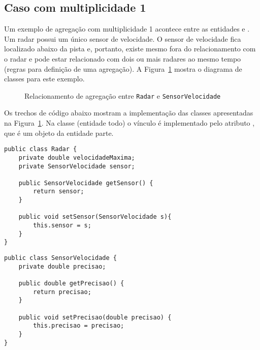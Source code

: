 \subsection{Caso com multiplicidade 1}

Um exemplo de agregação com multiplicidade 1 acontece entre as entidades  e . Um radar possui um único sensor de velocidade. O sensor de velocidade fica localizado abaixo da pista e, portanto, existe mesmo fora do relacionamento com o radar e pode estar relacionado com dois ou mais radares ao mesmo tempo (regras para definição de uma agregação). A Figura~\ref{fig:agregacao-radar-sensor} mostra o diagrama de classes para este exemplo.

\begin{figure}[h]
	\centering
	
	
	\caption{Relacionamento de agregação entre \texttt{Radar} e \texttt{SensorVelocidade}}
	\label{fig:agregacao-radar-sensor}
\end{figure}

Os trechos de código abaixo mostram a implementação das classes apresentadas na Figura~\ref{fig:agregacao-radar-sensor}. Na classe  (entidade todo) o vínculo é implementado pelo atributo , que é um objeto da entidade parte.

\begin{verbatim}
public class Radar {
	private double velocidadeMaxima;
	private SensorVelocidade sensor;
	
	public SensorVelocidade getSensor() {
		return sensor;
	}
	
	public void setSensor(SensorVelocidade s){
		this.sensor = s;
	}
}
\end{verbatim}
 
\begin{verbatim}
public class SensorVelocidade {
	private double precisao;
	
	public double getPrecisao() {
		return precisao;
	}
	
	public void setPrecisao(double precisao) {
		this.precisao = precisao;
	}
}
\end{verbatim}

